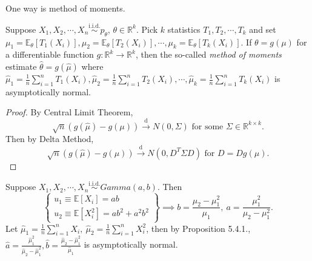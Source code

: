 \documentclass[a4paper]{article}
\begin{document}
\begin{answer}
	One way is method of moments.
\end{answer}

\begin{prop}
	Suppose $X_1,X_2,\cdots,X_n \stackrel{\text{i.i.d.}}{\sim} p_{\theta}$, $\theta \in \mathbb{R}^k$. Pick $k$ statistics $T_1,T_2,\cdots,T_k$ and set $\mu_1 = \mathbb{E}_{\theta}[T_1(X_i)], \mu_2 = \mathbb{E}_{\theta}[T_2(X_i)],\cdots,\mu_k = \mathbb{E}_{\theta}[T_k(X_i)]$. If $\theta = g(\mu)$ for a differentiable function $g: \mathbb{R}^k \to \mathbb{R}^k$, then the so-called \emph{method of moments} estimate $\hat{\theta} = g(\hat{\mu})$ where $\hat{\mu}_1 = \frac{1}{n} \sum\limits_{i=1}^n T_1(X_i), \hat{\mu}_2 = \frac{1}{n} \sum\limits_{i=1}^n T_2(X_i), \cdots, \hat{\mu}_k = \frac{1}{n} \sum\limits_{i=1}^n T_k(X_i)$ is asymptotically normal.
\end{prop}

\begin{proof}
	By Central Limit Theorem,
	\begin{equation*}
		\sqrt{n}(g(\hat{\mu}) - g(\mu)) \stackrel{\text{d}}{\longrightarrow} N(0,\Sigma) \text{ for some } \Sigma \in \mathbb{R}^{k \times k}.
	\end{equation*}
	Then by Delta Method,
	\begin{equation*}
		\sqrt{n}(g(\hat{\mu})-g(\mu)) \stackrel{\text{d}}{\longrightarrow} N(0,D^T \Sigma D) \text{ for } D = D g(\mu).
	\end{equation*}
\end{proof}

\begin{eg}
	Suppose $X_1,X_2,\cdots,X_n \stackrel{\text{i.i.d.}}{\sim} Gamma(a,b)$. Then
	\begin{equation*}
		\left\{\begin{array}{l}
			u_1 \equiv \mathbb{E}\left[X_i\right] = ab \\
			u_2 \equiv \mathbb{E}\left[X_i^2\right] = ab^2 + a^2b^2
		\end{array}\right\} \implies b =\frac{\mu_2-\mu_1^2}{\mu_1}, \ a = \frac{\mu_1^2}{\mu_2 - \mu_1^2}.
	\end{equation*}	
	Let $\hat{\mu}_1 = \frac{1}{n} \sum\limits_{i=1}^n X_i, \ \hat{\mu}_2 = \frac{1}{n} \sum\limits_{i=1}^n X_i^2$, then by Proposition 5.4.1., $\hat{a} = \frac{\hat{\mu}_1^2}{\hat{\mu}_2 - \hat{\mu}_1^2}, \hat{b} = \frac{\hat{\mu}_2 - \hat{\mu}_1^2}{\hat{\mu}_1}$ is asymptotically normal.
\end{eg}
\end{document}
